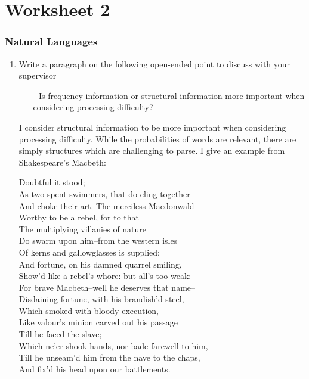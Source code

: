 \documentclass[10pt,\jkfside,a4paper]{article}
\begin{document}
\part{Worksheet 2}

\section{Natural Languages}

\begin{enumerate}

\item Write a paragraph on the following open-ended point to discuss with
your supervisor

\begin{itemize}

\item[-] Is frequency information or structural information more important
when considering processing difficulty?

\end{itemize}

I consider structural information to be more important when considering
processing difficulty. While the probabilities of words are relevant, there
are simply structures which are challenging to parse. I give an example from
Shakespeare's Macbeth:

\begin{center}
\begin{minipage}{0.6\textwidth}
Doubtful it stood;\\
As two spent swimmers, that do cling together\\
And choke their art. The merciless Macdonwald--\\
Worthy to be a rebel, for to that\\
The multiplying villanies of nature\\
Do swarm upon him--from the western isles\\
Of kerns and gallowglasses is supplied;\\
And fortune, on his damned quarrel smiling,\\
Show'd like a rebel's whore: but all's too weak:\\
For brave Macbeth--well he deserves that name--\\
Disdaining fortune, with his brandish'd steel,\\
Which smoked with bloody execution,\\
Like valour's minion carved out his passage\\
Till he faced the slave;\\
Which ne'er shook hands, nor bade farewell to him,\\
Till he unseam'd him from the nave to the chaps,\\
And fix'd his head upon our battlements.
\end{minipage}
\end{center}


\end{enumerate}
\end{document}
